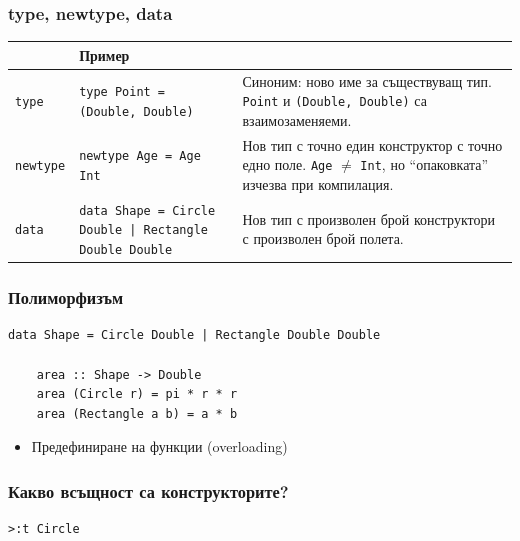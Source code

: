 \documentclass{beamer}
\begin{document}
\begin{frame}
  \frametitle{type, newtype, data}

\footnotesize
\renewcommand{\arraystretch}{1.5}
\begin{tabular}{|p{}|p{}|p{}|}
  \hline
  & \textbf{Пример} &  \\
  \hline
  \texttt{type} & \texttt{type Point = (Double, Double)}
    & Синоним: ново име за съществуващ тип. \texttt{Point} и \texttt{(Double, Double)} са взаимозаменяеми. \\
  \hline
  \texttt{newtype} & \texttt{newtype Age = Age Int}
    & Нов тип с точно един конструктор с точно едно поле. \texttt{Age} $\neq$ \texttt{Int}, но ``опаковката'' изчезва при компилация. \\
  \hline
  \texttt{data} & \texttt{data Shape = Circle Double | Rectangle Double Double}
    & Нов тип с произволен брой конструктори с произволен брой полета. \\
  \hline
\end{tabular}

\end{frame}



\begin{frame}[fragile]
  \frametitle{Полиморфизъм}

  \begin{lstlisting}[basicstyle=\small]
    data Shape = Circle Double | Rectangle Double Double

    area :: Shape -> Double
    area (Circle r) = pi * r * r
    area (Rectangle a b) = a * b
  \end{lstlisting}

\begin{itemize}
  \item Предефиниране на функции (overloading)
\end{itemize}

\end{frame}

\begin{frame}[fragile]
  \frametitle{Какво всъщност са конструкторите?}

  \begin{lstlisting}[basicstyle=\small]
    >:t Circle
  \end{lstlisting}

\end{frame}
\end{document}
